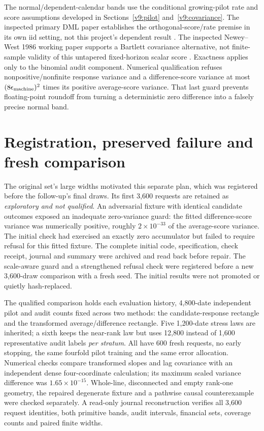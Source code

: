 The normal/dependent-calendar bands use the conditional growing-pilot rate
and score assumptions developed in Sections~\ref{v9:pilot} and~\ref{v9:covariance}. The inspected
primary DML paper establishes the orthogonal-score/rate premise in its own
iid setting, not this project's dependent result \citep{dml2018}. The
inspected Newey--West 1986 working paper supports a Bartlett covariance
alternative, not finite-sample validity of this untapered fixed-horizon
scalar score \citep{newey1986}. Exactness applies only to the binomial audit
component. Numerical qualification refuses nonpositive/nonfinite response
variance and a difference-score variance at most
$(8\epsilon_{\rm machine})^2$ times its positive average-score variance.
That last guard prevents floating-point roundoff from turning a deterministic
zero difference into a falsely precise normal band.

\section{Registration, preserved failure and fresh comparison}

The original set's large widths motivated this separate plan, which was
registered before the follow-up's final draws. Its first 3,600 requests are
retained as \emph{exploratory and not qualified}. An adversarial fixture with
identical candidate outcomes exposed an inadequate zero-variance guard: the
fitted difference-score variance was numerically positive, roughly
$2\times10^{-33}$ of the average-score variance. The initial check had
exercised an exactly zero accumulator but failed to require refusal for this
fitted fixture. The complete initial code, specification, check receipt,
journal and summary were archived and read back before repair. The scale-aware
guard and a strengthened refusal check were registered before a new 3,600-draw
comparison with a fresh seed. The initial results were not promoted or
quietly hash-replaced.

The qualified comparison holds each evaluation history, 4,800-date independent
pilot and audit counts fixed across two methods: the candidate-response
rectangle and the transformed average/difference rectangle. Five 1,200-date
stress laws are inherited; a sixth keeps the near-rank law but uses 12,800
instead of 1,600 representative audit labels \emph{per stratum}. All have
600 fresh requests, no early stopping, the same fourfold pilot training and
the same error allocation. Numerical checks compare transformed slopes and
lag covariance with an independent dense four-coordinate calculation; its
maximum scaled variance difference was $1.65\times10^{-15}$. Whole-line,
disconnected and empty rank-one geometry, the repaired degenerate fixture and
a pathwise causal counterexample were checked separately. A read-only journal
reconstruction verifies all 3,600 request identities, both primitive bands,
audit intervals, financial sets, coverage counts and paired finite widths.

